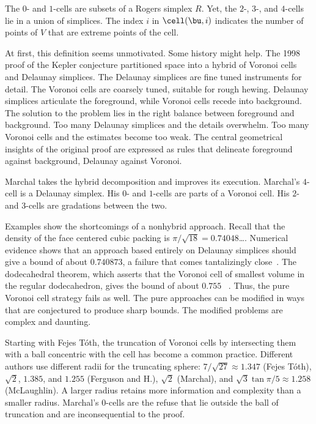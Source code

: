 %

The $0$- and $1$-cells are  subsets of a Rogers  simplex
$R$.  Yet, the $2$-, $3$-, and $4$-cells lie in a union of
simplices.  The index $i$ in  $\cell(\bu,i)$ indicates the number
of points of $V$ that are extreme points of the cell. 

At first, this definition seems unmotivated.  Some history might help.
The 1998 proof of the Kepler conjecture partitioned space into a
hybrid of Voronoi cells and Delaunay simplices.  The Delaunay
simplices are fine tuned instruments for detail.  The Voronoi cells
are coarsely tuned, suitable for rough hewing.  Delaunay simplices
articulate the foreground, while Voronoi cells recede into background.
The solution to the problem lies in the right balance between
foreground and background.  Too many Delaunay simplices and the
details overwhelm.  Too many Voronoi cells and the estimates become
too weak.  The central geometrical insights of the original proof are
expressed as rules that delineate foreground against background,
Delaunay against Voronoi.

Marchal takes the  hybrid decomposition and improves its
execution.  Marchal's $4$-cell is a Delaunay simplex.  His $0$- and
$1$-cells are parts of a Voronoi cell.  His $2$- and $3$-cells are
gradations between the two.

Examples show the shortcomings of a nonhybrid approach.  Recall that
the density of the face centered cubic packing is
$\pi/\sqrt{18}=0.74048$\ldots.  Numerical evidence shows that an
approach based entirely on Delaunay simplices should give a bound of
about $0.740873$, a failure that comes tantalizingly
close~\cite{Hales:1992:JCAM}.  The dodecahedral theorem, which asserts
that the Voronoi cell of smallest volume in the regular dodecahedron,
gives the bound of about $0.755$ ~\cite{Hales:2010:Dodec}.  Thus, the
pure Voronoi cell strategy fails as well.  The pure approaches can be
modified in ways that are conjectured to produce sharp bounds. The
modified problems are complex and daunting.

Starting with Fejes T\'oth, the truncation of Voronoi cells by
intersecting them with a ball concentric with the cell has become a
common practice.  Different authors use different radii for the
truncating sphere: $7/\sqrt{27}\approx 1.347$ (Fejes T\'oth),
$\sqrt2$, $1.385$, and $1.255$ (Ferguson and H.), $\sqrt2$ (Marchal),
and $\sqrt{3}\tan{\pi/5}\approx 1.258$ (McLaughlin).  A larger radius
retains more information and complexity than a smaller radius.
Marchal's $0$-cells are the refuse that lie outside the ball of
truncation and are inconsequential to the proof.



